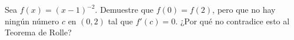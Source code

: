 \item Sea $f(x) = (x - 1)^{-2}$. Demuestre que $f(0) = f(2)$, pero que no hay ningún número $c$ en $(0, 2)$ tal que $f'(c) = 0$. ¿Por qué no contradice esto al Teorema de Rolle?
